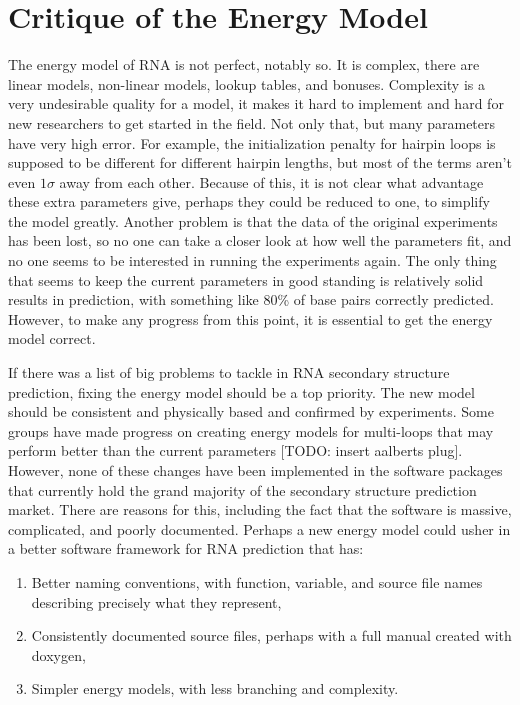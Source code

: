 \section{Critique of the Energy Model}

The energy model of RNA is not perfect, notably so. It is complex,
there are linear models, non-linear models, lookup tables, and
bonuses. Complexity is a very undesirable quality for a model, it
makes it hard to implement and hard for new researchers to get started
in the field.  Not only that, but many parameters have very high
error. For example, the initialization penalty for hairpin loops is
supposed to be different for different hairpin lengths, but most of
the terms aren't even $1\sigma$ away from each other. Because of this,
it is not clear what advantage these extra parameters give, perhaps
they could be reduced to one, to simplify the model greatly. Another
problem is that the data of the original experiments has been lost, so
no one can take a closer look at how well the parameters fit, and no
one seems to be interested in running the experiments again. The only
thing that seems to keep the current parameters in good standing is
relatively solid results in prediction, with something like 80\% of
base pairs correctly predicted. However, to make any progress from
this point, it is essential to get the energy model correct. 

If there was a list of big problems to tackle in RNA secondary
structure prediction, fixing the energy model should be a top
priority. The new model should be consistent and physically based and
confirmed by experiments. Some groups have made progress on creating
energy models for multi-loops that may perform better than the current
parameters [TODO: insert aalberts plug]. However, none of these
changes have been implemented in the software packages that currently
hold the grand majority of the secondary structure prediction
market. There are reasons for this, including the fact that the
software is massive, complicated, and poorly documented. Perhaps a new
energy model could usher in a better software framework for RNA
prediction that has:

\begin{enumerate}
\item Better naming conventions, with function, variable, and source
  file names describing precisely what they represent,
\item Consistently documented source files, perhaps with a full manual
  created with doxygen,  
\item Simpler energy models, with less branching and complexity.
\end{enumerate}

